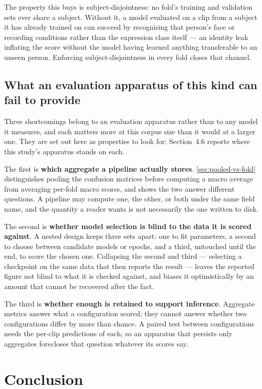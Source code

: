 The property this buys is subject-disjointness: no fold's training and validation sets ever share a subject. Without it, a model evaluated on a clip from a subject it has already trained on can succeed by recognising that person's face or recording conditions rather than the expression class itself --- an identity leak inflating the score without the model having learned anything transferable to an unseen person. Enforcing subject-disjointness in every fold closes that channel.

\subsection{What an evaluation apparatus of this kind can fail to provide}
\label{sec:apparatus-gaps}

Three shortcomings belong to an evaluation apparatus rather than to any model it measures, and each matters more at this corpus size than it would at a larger one. They are set out here as properties to look for; Section~4.6 reports where this study's apparatus stands on each.

The first is \textbf{which aggregate a pipeline actually stores}. \autoref{sec:pooled-vs-fold} distinguishes pooling the confusion matrices before computing a macro average from averaging per-fold macro scores, and shows the two answer different questions. A pipeline may compute one, the other, or both under the same field name, and the quantity a reader wants is not necessarily the one written to disk.

The second is \textbf{whether model selection is blind to the data it is scored against}. A nested design keeps three sets apart: one to fit parameters, a second to choose between candidate models or epochs, and a third, untouched until the end, to score the chosen one. Collapsing the second and third --- selecting a checkpoint on the same data that then reports the result --- leaves the reported figure not blind to what it is checked against, and biases it optimistically by an amount that cannot be recovered after the fact.

The third is \textbf{whether enough is retained to support inference}. Aggregate metrics answer what a configuration scored; they cannot answer whether two configurations differ by more than chance. A paired test between configurations needs the per-clip predictions of each, so an apparatus that persists only aggregates forecloses that question whatever its scores say.


\section{Conclusion}
\label{sec:ch2-conclusion}

